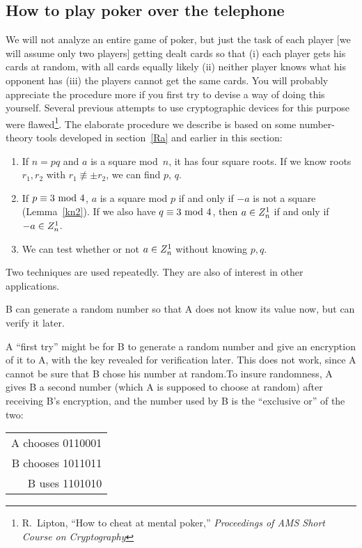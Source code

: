 \subsection{How to play poker over the telephone}
We will not analyze an entire game of poker, but just the task
of each player [we will assume only two players]
 getting dealt cards so that (i) each player gets his cards at
random, with all cards equally likely (ii) neither player knows
what his opponent has (iii) the players cannot get the same cards.
You will probably appreciate the procedure more if you first try
to devise a way of doing this yourself.\pq
Several previous attempts to use cryptographic devices for this
purpose were flawed\footnote{R.\ Lipton, ``How to cheat at mental
poker,'' {\it Proceedings of AMS Short Course on Cryptography}}.
 The elaborate procedure we describe is based on some number-theory
tools developed in section~\ref{Ra}
 and earlier in this section:\begin{enumerate}
\item If $n=pq$ and $a$ is a square mod~$n$, it has four square
roots. If we know roots $r_1,r_2$ with $r_1\not\equiv\pm r_2$,
we can find $p$, $q$.\item If $p\equiv3\hbox{ mod }4$, $a$ is a square mod $p$
if and only if $-a$ is not a square (Lemma~\ref{kn2}).
If we also have $q\equiv3\hbox{ mod }4$,
then $a\in Z^1_n$ if and only if $-a\in Z^1_n$.\item We can test whether
or not $a\in Z^1_n$ without knowing $p,q$.\end{enumerate}
\pq Two techniques are used repeatedly.  They are also of interest
in other applications.\begin{Th}\label{R} B can generate
a random number so that A does not know its value now, but can
verify it later. \end{Th}A ``first try'' might be for B to generate
a random number and give an encryption of it to A, with the key
 revealed for verification later.  This does not work, since
A cannot be sure that B chose his number at random.\pq To insure
randomness, A gives B a second number (which A is supposed to
choose at  random) after receiving B's encryption, 
and the number used by B is the ``exclusive or'' of the two:
\begin{center}\begin{tabular}{r} A chooses 0110001\\B chooses 1011011\\
\cline{1-1}B uses 1101010\end{tabular}\end{center}
